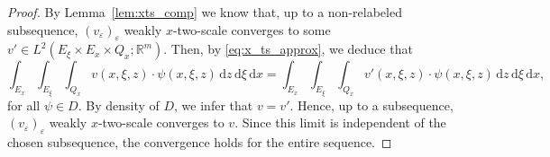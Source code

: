 \documentclass[reqno,11pt]{amsart}
\numberwithin{equation}{section}
\theoremstyle{thmlemcorr}
\numberwithin{theorem}{section}
\theoremstyle{thmlemcorr*}
\theoremstyle{defi}
\theoremstyle{remexample}
\theoremstyle{ass}
\newcommand{\R}{\mathbb{R}}
\renewcommand{\epsilon}{\varepsilon}
\newcommand{\dd}{\,\mathrm{d}}
\DeclarePairedDelimiter{\norm}{\lVert}{\rVert}
\newcommand{\1}{\mathds{1}}
\newcommand{\veps}{\varepsilon}
\newcommand{\seq}[1]{(#1_k)_{k}}
\newcommand{\sequence}[2]{(#1_#2)_{#2}}
\begin{document}
\begin{proof}
By Lemma~\ref{lem:xts_comp} we know that, up to a non-relabeled subsequence, $(v_\epsilon)_\epsilon$ weakly $x$-two-scale converges to some $v'\in L^2(E_\xi\times E_x\times Q_x;\R^m)$. Then, by \eqref{eq:x_ts_approx}, we deduce that
\[
\int_{E_x}\int_{E_\xi}\int_{Q_x}v(x,\xi,z) \cdot \psi(x,\xi,z)\dd z\dd \xi \dd x = \int_{E_x}\int_{E_\xi}\int_{Q_x}v'(x,\xi,z)\cdot \psi(x,\xi,z)\dd z\dd \xi \dd x,
\]
for all $\psi \in D$. By density of $D$, we infer that $v=v'$. Hence, up to a subsequence, $(v_\epsilon)_\epsilon$ weakly $x$-two-scale converges to $v$. Since this limit is independent of the chosen subsequence, the convergence holds for the entire sequence.

\end{proof}
\end{document}
